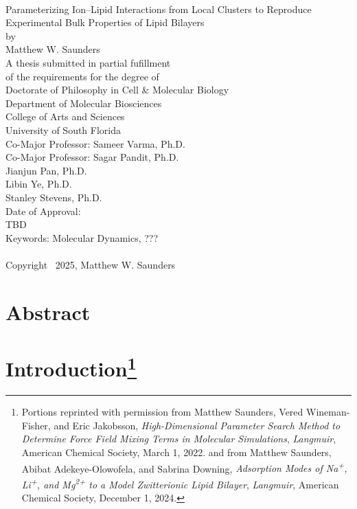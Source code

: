 \documentclass[12pt,openany,final]{book}
\author{Matthew Saunders}
\begin{document}
\pagestyle{plain}
{}
\begin{titlepage}
\begin{centering}

~\\[1in]
Parameterizing Ion–Lipid Interactions from Local Clusters to Reproduce Experimental Bulk Properties of Lipid Bilayers
~\\[3\baselineskip]
by
~\\[3\baselineskip]
Matthew W. Saunders
~\\[4\baselineskip]
A thesis submitted in partial fufillment\\
of the requirements for the degree of\\
Doctorate of Philosophy in Cell \& Molecular Biology
~\\[2\baselineskip]
Department of Molecular Biosciences\\
College of Arts and Sciences\\
University of South Florida
~\\[2\baselineskip]
Co-Major Professor: Sameer Varma, Ph.D.\\
Co-Major Professor: Sagar Pandit, Ph.D.\\
Jianjun Pan, Ph.D.\\
Libin Ye, Ph.D.\\
Stanley Stevens, Ph.D.
~\\[2\baselineskip]
Date of Approval:~\\
TBD
~\\[3\baselineskip]
Keywords: Molecular Dynamics, ???\\
~\\
Copyright \textsuperscript\textcopyright~2025, Matthew W. Saunders\\

\end{centering}
\end{titlepage}
\tableofcontents
\listoftables
\listoffigures

\doublespacing
\clearpage
{}
\chapter*{Abstract}


\chapter[Introduction]{Introduction\footnote{Portions reprinted with permission from Matthew Saunders, Vered Wineman-Fisher, and Eric Jakobsson, \textit{High-Dimensional Parameter Search Method to Determine Force Field Mixing Terms in Molecular Simulations}, 
\textit{Langmuir}, American Chemical Society, March 1, 2022. and from Matthew Saunders, Abibat Adekeye-Olowofela, and Sabrina Downing, \textit{Adsorption Modes of Na\textsuperscript{+}, Li\textsuperscript{+}, and Mg\textsuperscript{2+} to a Model Zwitterionic Lipid Bilayer}, 
\textit{Langmuir}, American Chemical Society, December 1, 2024.}}
 \graphicspath{{CH1/figures/}}

\end{document}
